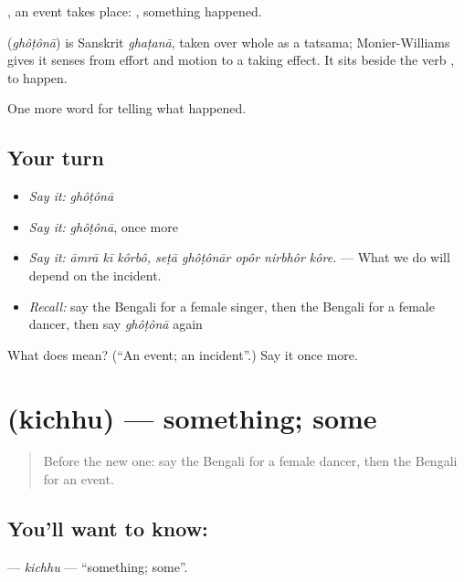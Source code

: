 , an event takes place:   , something happened.

\begin{cousinweb}
\textbf{} (\emph{ghôṭônā}) is Sanskrit \emph{ghaṭanā}, taken over whole as a tatsama; Monier-Williams gives it senses from effort and motion to a taking effect. It sits beside the verb , to happen.
\end{cousinweb}

\begin{grammarlens}[title={What you've built}]
One more word for telling what happened.
\end{grammarlens}

\subsection*{Your turn}
\begin{itemize}
\raggedright
  \item \emph{Say it:} \emph{ghôṭônā}
  \item \emph{Say it:} \emph{ghôṭônā}, once more
  \item \emph{Say it:} \emph{āmrā kī kôrbô, seṭā ghôṭônār opôr nirbhôr kôre.} — What we do will depend on the incident.
  \item \emph{Recall:} say the Bengali for a female singer, then the Bengali for a female dancer, then say \emph{ghôṭônā} again
\end{itemize}

\begin{tcolorbox}[breakable,colback=teal!4,colframe=teal!35!black,title={Before you move on}]
What does  mean? (\textquotedblleft{}An event; an incident\textquotedblright{}.) Say it once more.
\end{tcolorbox}
\section[\texorpdfstring{\bn{কিছু} (kichhu)}{কিছু (kichhu)}]{ (kichhu) — something; some}

\label{lesson:BN-C276-kichhu}



\begin{quote}
Before the new one: say the Bengali for a female dancer, then the Bengali for an event.
\end{quote}

\subsection*{You'll want to know: }
\textbf{} — \emph{kichhu} — \textquotedblleft{}something; some\textquotedblright{}.

